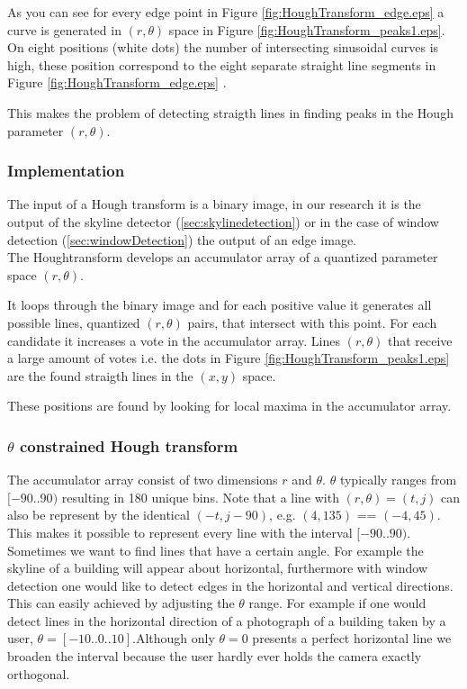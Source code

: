 	 
	 As you can see for every edge point 
	 in Figure \ref{fig:HoughTransform_edge.eps} 
	 a curve is generated in $(r,\theta)$ space in Figure 
\ref{fig:HoughTransform_peaks1.eps}.
	 On eight positions (white dots) the number of intersecting sinusoidal
	 curves is high, these position correspond to the eight separate straight
	 line segments in Figure \ref{fig:HoughTransform_edge.eps} .
	
	This makes the problem of detecting straigth lines in finding peaks in the 
	Hough parameter $(r,\theta)$.

\subsubsection{Implementation}
	The input of a Hough transform is a binary image, in our research it is the output of 
	the skyline detector (\ref{sec:skylinedetection}) or in the case of window
	detection (\ref{sec:windowDetection}) the output of an edge image.\\

	The Houghtransform develops an accumulator array of a quantized parameter space $(r, \theta)$.

	It loops through the binary image and for each positive value 
	it generates all possible lines, quantized $(r, \theta)$ pairs, that intersect with this point.
	For each candidate it increases a vote in the accumulator array.
	Lines $(r, \theta)$ that receive a large amount of votes
	i.e. the dots in Figure \ref{fig:HoughTransform_peaks1.eps} are the found straigth lines in the $(x,y)$ space.

	These positions are found by looking for local maxima in the accumulator array.

\subsubsection{$\theta$ constrained Hough transform}
The accumulator array consist of two dimensions $r$ and $\theta$.
$\theta$ typically ranges from $[-90..90)$ resulting in 180 unique bins.
Note that a line with $(r, \theta) = (t,j)$ can also be represent by the identical $(-t, j-90)$, e.g. $(4, 135)$ == $(-4, 45)$.
This makes it possible to represent every line with the interval $[-90..90)$.\\

Sometimes we want to find lines that have a certain angle.
For example the skyline of a building will appear about horizontal, furthermore with window detection one would like to detect edges in the horizontal and vertical directions.
This can easily achieved by adjusting the $\theta$ range.
For example if one would detect lines in the horizontal direction of
a photograph of a building taken by a user, $\theta = [-10..0..10]$.Although
only $\theta = 0$ presents a perfect horizontal line we broaden the interval
because the user hardly ever holds the camera exactly orthogonal.
	
